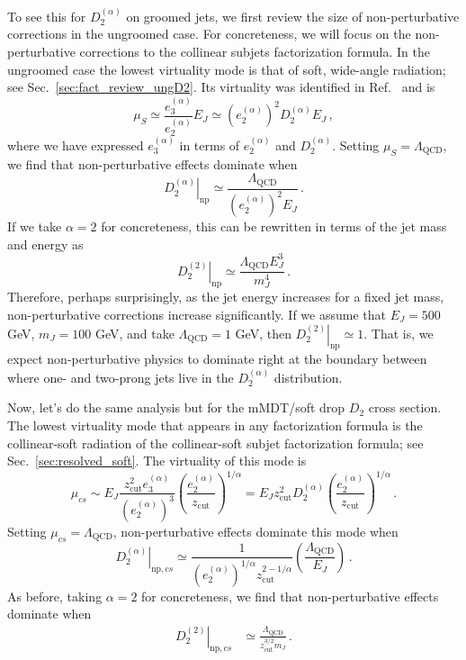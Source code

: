 \documentclass[a4paper,11pt]{article}
\newcommand{\ecf}[2]{e_{#1}^{(#2)}}
\def\zcut{z_{\text{cut}}}
\newcommand{\Dobs}[2]{D_{#1}^{(#2)}}
\DeclareRobustCommand{\Sec}[1]{Sec.~\ref{#1}}
\DeclareRobustCommand{\Ref}[1]{Ref.~\cite{#1}}
\begin{document}
To see this for $D_2^{(\alpha)}$ on groomed jets, we first review the size of non-perturbative corrections in the ungroomed case.  For concreteness, we will focus on the non-perturbative corrections to the collinear subjets factorization formula.  In the ungroomed case the lowest virtuality mode is that of soft, wide-angle radiation; see \Sec{sec:fact_review_ungD2}.  Its virtuality was identified in \Ref{Larkoski:2015kga} and is
\begin{equation}
\mu_S \simeq \frac{\ecf{3}{\alpha}}{\ecf{2}{\alpha}} E_J \simeq (\ecf{2}{\alpha})^2 D_2^{(\alpha)}E_J\,,
\end{equation}
where we have expressed $\ecf{3}{\alpha}$ in terms of $\ecf{2}{\alpha}$ and $D_2^{(\alpha)}$.  Setting $\mu_S=\Lambda_\text{QCD}$, we find that non-perturbative effects dominate when
\begin{equation}
\left. D_2^{(\alpha)}\right|_\text{np} \simeq \frac{\Lambda_\text{QCD}}{(\ecf{2}{\alpha})^2 E_J}\,.
\end{equation}
If we take $\alpha = 2$ for concreteness, this can be rewritten in terms of the jet mass and energy as
\begin{equation}
\left. D_2^{(2)}\right|_\text{np} \simeq \frac{\Lambda_\text{QCD}E_J^3}{m_J^4}\,.
\end{equation}
Therefore, perhaps surprisingly, as the jet energy increases for a fixed jet mass, non-perturbative corrections increase significantly.  If we assume that $E_J = 500 $ GeV, $m_J = 100$ GeV, and take $\Lambda_\text{QCD} = 1$ GeV, then $\left. D_2^{(2)}\right|_\text{np} \simeq 1$.  That is, we expect non-perturbative physics to dominate right at the boundary between where one- and two-prong jets live in the $D_2^{(\alpha)}$ distribution.



Now, let's do the same analysis but for the mMDT/soft drop $D_2$ cross section.  The lowest virtuality mode that appears in any factorization formula is the collinear-soft radiation of the collinear-soft subjet factorization formula; see \Sec{sec:resolved_soft}.  The virtuality of this mode is
\begin{equation}
\mu_{cs} \sim E_J   \frac{   \zcut^2 \ecf{3}{\alpha} }{  (\ecf{2}{\alpha})^3  }   \left( \frac{    \ecf{2}{\alpha} }{  \zcut  }  \right)^{1/\alpha} =  E_J   \zcut^2 \Dobs{2}{\alpha}     \left( \frac{    \ecf{2}{\alpha} }{  \zcut  }  \right)^{1/\alpha}\,.
\end{equation}
Setting $\mu_{cs}=\Lambda_\text{QCD}$, non-perturbative effects dominate this mode when
\begin{equation}
\left. D_2^{(\alpha)}\right|_{\text{np},cs} \simeq \frac{1}{(\ecf{2}{\alpha})^{1/\alpha}  \zcut^{2-1/\alpha}  }\left(
\frac{\Lambda_\text{QCD}}{ E_J}
\right)\,.
\end{equation}
As before, taking $\alpha = 2$ for concreteness, we find that non-perturbative effects dominate when
\begin{align}
\left. D_2^{(2)}\right|_{\text{np},cs} &\simeq 
\frac{\Lambda_\text{QCD}}{\zcut^{3/2} m_J }\,.
\end{align}
\end{document}
